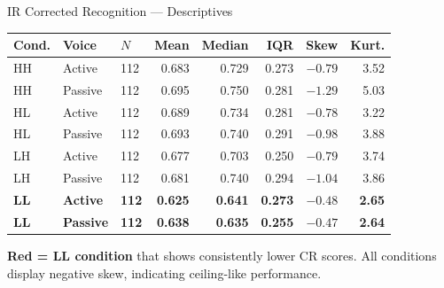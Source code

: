 \documentclass[aspectratio=169, 10pt]{beamer}
\newcommand{\sig}[1]{\textcolor{red!70!black}{\textbf{#1}}}
\begin{document}
\begin{frame}{IR Corrected Recognition — Descriptives}
  \renewcommand{\arraystretch}{1.15}
  \begin{center}
  \small
  \begin{tabular}{lllrrrrr}
    \toprule
    \textbf{Cond.} & \textbf{Voice} & $N$ & \textbf{Mean} & \textbf{Median} & \textbf{IQR} & \textbf{Skew} & \textbf{Kurt.} \\
    \midrule
    HH & Active  & 112 & 0.683 & 0.729 & 0.273 & $-0.79$ & 3.52 \\
    HH & Passive & 112 & 0.695 & 0.750 & 0.281 & $-1.29$ & 5.03 \\
    \addlinespace
    HL & Active  & 112 & 0.689 & 0.734 & 0.281 & $-0.78$ & 3.22 \\
    HL & Passive & 112 & 0.693 & 0.740 & 0.291 & $-0.98$ & 3.88 \\
    \addlinespace
    LH & Active  & 112 & 0.677 & 0.703 & 0.250 & $-0.79$ & 3.74 \\
    LH & Passive & 112 & 0.681 & 0.740 & 0.294 & $-1.04$ & 3.86 \\
    \addlinespace
    \sig{LL} & \sig{Active}  & \sig{112} & \sig{0.625} & \sig{0.641} & \sig{0.273} & \sig{$-0.48$} & \sig{2.65} \\
    \sig{LL} & \sig{Passive} & \sig{112} & \sig{0.638} & \sig{0.635} & \sig{0.255} & \sig{$-0.47$} & \sig{2.64}  \\
    \bottomrule
  \end{tabular}
  \end{center}
  \vspace{0.3em}
  \small \sig{Red = LL condition} that shows consistently lower CR scores.
  All conditions display negative skew, indicating ceiling-like performance.
\end{frame}
\end{document}

